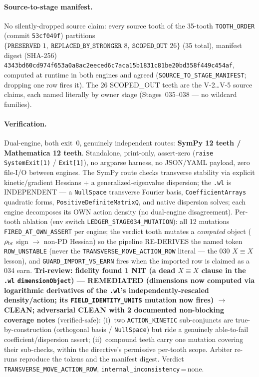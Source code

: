 \paragraph{Source-to-stage manifest.}
No silently-dropped source claim: every source tooth of the 35-tooth
\texttt{TOOTH\_ORDER} (commit \texttt{53cf049f}) partitions
\(\{\texttt{PRESERVED }1,\ \texttt{REPLACED\_BY\_STRONGER }8,\ \texttt{SCOPED\_OUT }26\}\)
(35 total), manifest digest (SHA-256)
\texttt{4343bd60cd974f653a0a8ac2eeced6c7aca15b1831c81be20bd358f449c454af}, computed
at runtime in both engines and agreed (\texttt{SOURCE\_TO\_STAGE\_MANIFEST}; dropping
one row fires it). The 26 SCOPED\_OUT teeth are the V-2\dots V-5 source claims, each
named literally by owner stage (Stages~035--038 --- no wildcard families).

\paragraph{Verification.}
Dual-engine, both exit~0, genuinely independent routes: \textbf{SymPy 12 teeth /
Mathematica 12 teeth}. Standalone, print-only, assert-zero
(\texttt{raise SystemExit(1)} / \texttt{Exit[1]}), no argparse harness, no JSON/YAML
payload, zero file-I/O between engines. The SymPy route checks transverse stability
via explicit kinetic/gradient Hessians + a generalized-eigenvalue dispersion; the
\texttt{.wl} is INDEPENDENT --- a \texttt{NullSpace} transverse Fourier basis,
\texttt{CoefficientArrays} quadratic forms, \texttt{PositiveDefiniteMatrixQ}, and
native dispersion solves; each engine decomposes its OWN action density (no
dual-engine disagreement). Per-tooth ablation (env switch
\texttt{LEDGER\_STAGE034\_MUTATION}): all 12 mutations \texttt{FIRED\_AT\_OWN\_ASSERT}
per engine; the verdict tooth mutates a \emph{computed} object (\(\rho_{\rm br}\)
sign \(\to\) non-PD Hessian) so the pipeline RE-DERIVES the named token
\texttt{ROW\_UNSTABLE} (never the \texttt{TRANSVERSE\_MOVE\_ACTION\_ROW} literal ---
the 030 \(X\equiv X\) lesson), and \texttt{GUARD\_IMPORT\_VS\_EARN} fires when the
imported row is claimed as a 034 earn. \textbf{Tri-review: fidelity found 1 NIT (a
dead \(X\equiv X\) clause in the \texttt{.wl} \texttt{dimensionObject}) --- REMEDIATED
(dimensions now computed via logarithmic derivatives of the \texttt{.wl}'s
independently-rescaled density/action; its \texttt{FIELD\_IDENTITY\_UNITS} mutation
now fires) \(\to\) CLEAN; adversarial CLEAN with 2 documented non-blocking coverage
notes} (verified-safe): (i)~two \texttt{ACTION\_KINETIC} sub-conjuncts are
true-by-construction (orthogonal basis / \texttt{NullSpace}) but ride a genuinely
able-to-fail coefficient/dispersion assert; (ii)~compound teeth carry one mutation
covering their sub-checks, within the directive's permissive per-tooth scope.
Arbiter re-runs reproduce the tokens and the manifest digest. Verdict
\texttt{TRANSVERSE\_MOVE\_ACTION\_ROW}, \texttt{internal\_inconsistency}\,=\,none.
